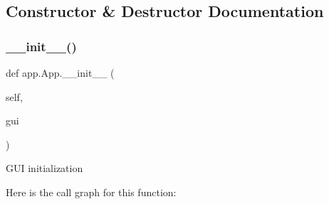 \subsection{Constructor \& Destructor Documentation}
\mbox{\label{classapp_1_1_app_a7ebfdd74ff42ca9b5c1dd6383b4641f8}} 
\subsubsection{\texorpdfstring{\+\_\+\+\_\+init\+\_\+\+\_\+()}{\_\_init\_\_()}}
{\footnotesize\ttfamily def app.\+App.\+\_\+\+\_\+init\+\_\+\+\_\+ (\begin{DoxyParamCaption}\item[{}]{self,  }\item[{}]{gui }\end{DoxyParamCaption})}

\begin{DoxyVerb}GUI initialization\end{DoxyVerb}
 Here is the call graph for this function\+:
